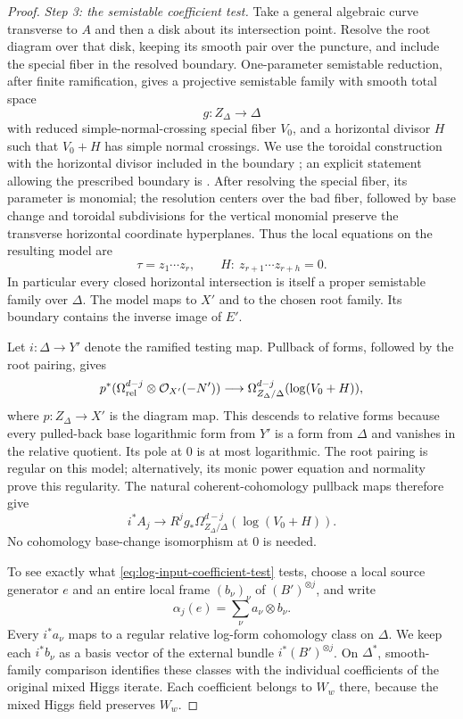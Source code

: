\begin{proof}
\smallskip\noindent\emph{Step 3: the semistable coefficient test.}
Take a general algebraic curve transverse to $A$ and then a disk
about its intersection point.  Resolve the root diagram over
that disk, keeping its smooth pair over the puncture, and include
the special fiber in the resolved boundary.  One-parameter
semistable reduction, after finite ramification, gives a
projective semistable family with smooth total space
\[
 g:Z_\Delta\longrightarrow\Delta
\]
with reduced simple-normal-crossing special fiber $V_0$, and a
horizontal divisor $H$ such that $V_0+H$ has simple normal
crossings.  We use the toroidal construction with the horizontal
divisor included in the boundary
\cite[Chapter~IV, \S3]{KKMS}; an explicit statement allowing
the prescribed boundary is \cite[Theorem~7.17]{KollarMori}.
After resolving the special fiber, its parameter is monomial;
the resolution centers over the bad fiber, followed by base
change and toroidal subdivisions for the vertical
monomial preserve the transverse horizontal coordinate
hyperplanes.  Thus the local equations on the resulting model
are
\begin{equation}\label{eq:log-input-semistable-coordinates}
 \tau=z_1\cdots z_r,
 \qquad H:\ z_{r+1}\cdots z_{r+h}=0.
\end{equation}
In particular every closed horizontal intersection is itself a
proper semistable family over $\Delta$.  The model maps to $X'$
and to the chosen root family.  Its boundary contains the
inverse image of $E'$.

Let $i:\Delta\to Y'$ denote the ramified testing map.  Pullback
of forms, followed by the root pairing, gives
\[
 p^*(\Omega^{d-j}_{\mathrm{rel}}\otimes\mathcal O_{X'}(-N'))
 \longrightarrow
 \Omega^{d-j}_{Z_\Delta/\Delta}(\log(V_0+H)),
\]
where $p:Z_\Delta\to X'$ is the diagram map.  This descends to
relative forms because every pulled-back base logarithmic form
from $Y'$ is a form from $\Delta$ and vanishes in the relative
quotient.  Its pole at $0$ is at most logarithmic.  The root
pairing is regular on this model; alternatively, its monic
power equation and normality prove this regularity.
The natural coherent-cohomology pullback maps therefore give
\begin{equation}\label{eq:log-input-coefficient-test}
 i^*A_j\longrightarrow
 R^j g_*\Omega^{d-j}_{Z_\Delta/\Delta}(\log(V_0+H)).
\end{equation}
No cohomology base-change isomorphism at $0$ is needed.

To see exactly what \eqref{eq:log-input-coefficient-test} tests,
choose a local source generator $e$ and an entire local frame
$(b_\nu)_\nu$ of $(B')^{\otimes j}$, and write
\[
 \alpha_j(e)=\sum_\nu a_\nu\otimes b_\nu.
\]
Every $i^*a_\nu$ maps to a regular relative log-form cohomology
class on $\Delta$.  We keep each $i^*b_\nu$ as a basis vector
of the external bundle $i^*(B')^{\otimes j}$.  On $\Delta^*$,
smooth-family comparison identifies these classes with the
individual coefficients of the original mixed Higgs iterate.
Each coefficient belongs to $W_w$ there, because the mixed
Higgs field preserves $W_w$.


\end{proof}
